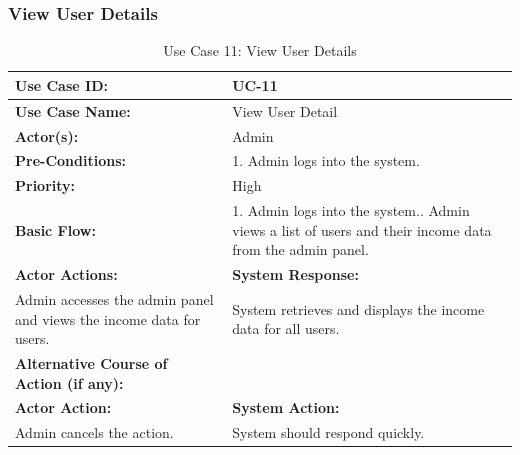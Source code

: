 \documentclass[12pt]{article}
\begin{document}
\subsubsection{View User Details}
\vspace{0.5 cm}
    \begin{table}[H] %
    \centering
    \begin{tabular}{|p{4cm}|p{10cm}|}
        \hline
        \textbf{Use Case ID:} & UC-11 \\ \hline
        \textbf{Use Case Name:} & View User Detail \\ \hline
        \textbf{Actor(s):} & Admin \\ \hline
        \textbf{Pre-Conditions:} & 
        1. Admin logs into the system.\\ \hline
        \textbf{Priority:} & High \\ \hline
        \textbf{Basic Flow:} & 1. Admin logs into the system.\newline
2. Admin views a list of users and their income data from the admin panel.\\ \hline
        \textbf{Actor Actions:} & \textbf{System Response:} \\ \hline
        Admin accesses the admin panel and views the income data for users. & System retrieves and displays the income data for all users. \\ \hline
        \textbf{Alternative Course of Action (if any):} &  \\ \hline
        \textbf{Actor Action:} & \textbf{System Action:} \\ \hline
      Admin cancels the action. & System should respond quickly.\\ \hline
     \end{tabular}
    \caption{Use Case 11: View User Details}
\end{table}
\newpage
\vspace{1 cm} %
\noindent
\end{document}
